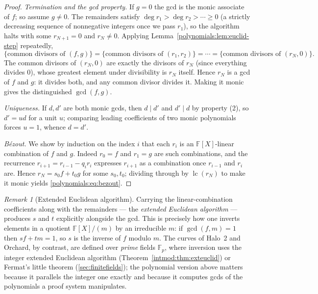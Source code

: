 \documentclass[11pt,a4paper]{article}
\theoremstyle{definition}
\theoremstyle{remark}
\newtheorem{remark}[theorem]{Remark}
\newcommand{\F}{\ensuremath{\mathbb{F}}}
\newcommand{\Fp}{\ensuremath{\mathbb{F}_{p}}}
\begin{document}
\begin{proof}
\emph{Termination and the gcd property.} If \(g = 0\) the gcd is the monic
associate of \(f\); so assume \(g \neq 0\). The remainders satisfy
\(\deg r_1 > \deg r_2 > \cdots \ge 0\) (a strictly decreasing sequence of
nonnegative integers once we pass \(r_1\)), so the algorithm halts with some
\(r_{N+1} = 0\) and \(r_N \neq 0\). Applying
Lemma~\ref{polynomials:lem:euclid-step} repeatedly,
\[
  \{\text{common divisors of } (f, g)\}
  = \{\text{common divisors of } (r_1, r_2)\}
  = \cdots
  = \{\text{common divisors of } (r_N, 0)\}.
\]
The common divisors of \((r_N, 0)\) are exactly the divisors of \(r_N\) (since
everything divides \(0\)), whose greatest element under divisibility is \(r_N\)
itself. Hence \(r_N\) is a gcd of \(f\) and \(g\): it divides both, and any
common divisor divides it. Making it monic gives the distinguished
\(\gcd(f, g)\).

\emph{Uniqueness.} If \(d, d'\) are both monic gcds, then \(d \mid d'\) and
\(d' \mid d\) by property (2), so \(d' = u d\) for a unit \(u\); comparing
leading coefficients of two monic polynomials forces \(u = 1\), whence
\(d = d'\).

\emph{B\'ezout.} We show by induction on the index \(i\) that each \(r_i\) is an
\(\F[X]\)-linear combination of \(f\) and \(g\). Indeed \(r_0 = f\) and
\(r_1 = g\) are such combinations, and the recurrence
\(r_{i+1} = r_{i-1} - q_i r_i\) expresses \(r_{i+1}\) as a combination once
\(r_{i-1}\) and \(r_i\) are. Hence \(r_N = s_0 f + t_0 g\) for some
\(s_0, t_0\); dividing through by \(\operatorname{lc}(r_N)\) to make it monic
yields \eqref{polynomials:eq:bezout}.
\end{proof}

\begin{remark}[Extended Euclidean algorithm]\label{polynomials:rem:eea}
Carrying the linear-combination coefficients along with the remainders — the
\emph{extended Euclidean algorithm} — produces \(s\) and \(t\) explicitly
alongside the gcd. This is precisely how one inverts elements in a quotient
\(\F[X]/(m)\) by an irreducible \(m\): if \(\gcd(f, m) = 1\) then
\(s f + t m = 1\), so \(s\) is the inverse of \(f\) modulo \(m\). The curves of
Halo~2 and Orchard, by contrast, are defined over \emph{prime} fields \(\Fp\),
where inversion uses the integer extended Euclidean algorithm
(Theorem~\ref{intmod:thm:exteuclid}) or Fermat's little theorem
(\cref{sec:finitefields}); the polynomial version above matters because it
parallels the integer one exactly and because it computes gcds of the
polynomials a proof system manipulates.
\end{remark}
\end{document}
